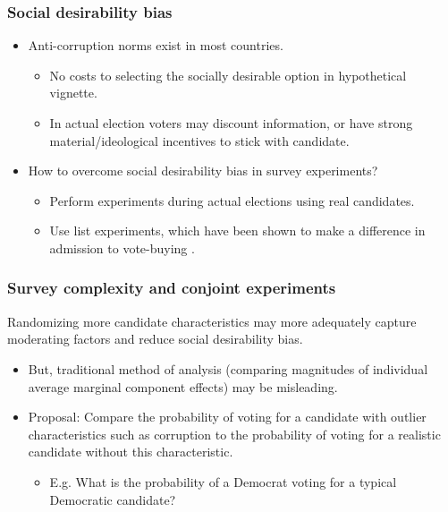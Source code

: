 \documentclass[usenames,dvipsnames]{beamer}
\begin{document}
\begin{frame}
\frametitle{Social desirability bias}
\begin{itemize}
\pause
\item Anti-corruption norms exist in most countries.
\begin{itemize}
\pause
\item No costs to selecting the socially desirable option in hypothetical vignette. 
\pause
\item In actual election voters may discount information, or have strong material/ideological incentives to stick with candidate.
\end{itemize}
\pause
\item How to overcome social desirability bias in survey experiments?
\begin{itemize}
\pause
\item Perform experiments during \textcolor{Cerulean}{actual elections} using real candidates.
\pause
\item Use \textcolor{Cerulean}{list experiments}, which have been shown to make a difference in admission to vote-buying \citep{gonzalez2012vote}.
\end{itemize}
\end{itemize}

\end{frame}

\begin{frame}
\frametitle{Survey complexity and conjoint experiments}
Randomizing more candidate characteristics may more adequately capture moderating factors and reduce social desirability bias.
\begin{itemize}
\pause
\item But, traditional method of analysis (comparing magnitudes of individual average marginal component effects) may be misleading. 
\pause
\item  \textcolor{Cerulean}{Proposal}: Compare the probability of voting for a candidate with outlier characteristics such as corruption to the probability of voting for a realistic candidate without this characteristic.
\begin{itemize}
\item E.g. What is the probability of a Democrat voting for a typical Democratic candidate?
\end{itemize}
\end{itemize}

\end{frame}
\end{document}
